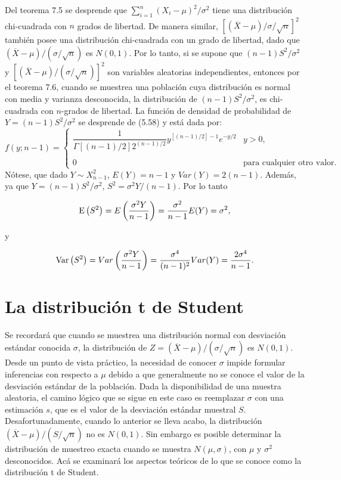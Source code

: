 Del teorema 7.5 se desprende que $\sum_{i=1}^n (X_i-\mu)^2/\sigma^2$ tiene una distribución chi-cuadrada con $n$ grados de libertad. De manera similar, $\left[(\overline{X}-\mu)/\sigma/\sqrt{n}\right]^2$ también posee una distribución chi-cuadrada con un grado de libertad, dado que $(\overline{X}-\mu)/(\sigma/\sqrt{n})$ es $N(0,1)$. Por lo tanto, si se supone que $(n-1)S^2/\sigma^2$ y $\left[(\overline{X}-\mu)/(\sigma/\sqrt{n})\right]^2$ son variables aleatorias independientes, entonces por el teorema 7.6, cuando se muestrea una población cuya distribución es normal con media y varianza desconocida, la distribución de $(n-1)S^2/\sigma^2$, es chi-cuadrada con $n$-grados de libertad. La función de densidad de probabilidad de $Y=(n-1)S^2/\sigma^2$ se desprende de (5.58) y está dada por:
$$
f(y;n-1)=
\left\{
    \begin{array}{lc}
	\dfrac{1}{\Gamma\left[(n-1)/2\right]2^{(n-1)/2}}y^{\left[(n-1)/2\right]-1}e^{-y/2} & y>0,\\\\
	0&\mbox{para cualquier otro valor.}
    \end{array}
\right.
$$
Nótese, que dado $Y\sim X_{n-1}^2$, $E(Y)=n-1$ y $Var(Y)=2(n-1)$. Además, ya que $Y=(n-1)S^2/\sigma^2$, $S^2=\sigma^2Y/(n-1)$. Por lo tanto
\begin{tcolorbox}
    $$\mathop{\mbox{\normalfont E}}\nolimits\left(S^2\right)=E\left(\dfrac{\sigma^2 Y}{n-1}\right)=\dfrac{\sigma^2}{n-1}E(Y)=\sigma^2,$$
\end{tcolorbox}

y 

\begin{tcolorbox}
    $$\mathop{\mbox{\normalfont Var}}\nolimits\left(S^2\right)=Var\left(\dfrac{\sigma^2Y}{n-1}\right)=\dfrac{\sigma^4}{(n-1)^2}Var(Y)=\dfrac{2\sigma^4}{n-1}.$$
\end{tcolorbox}


\section{La distribución t de Student}
Se recordará que cuando se muestrea una distribución normal con desviación estándar conocida $\sigma$, la distribución de $Z=(\overline{X}-\mu)/(\sigma/\sqrt{n})$ es $N(0,1)$. Desde un punto de vista práctico, la necesidad de conocer $\sigma$ impide formular inferencias con respecto a $\mu$ debido a que generalmente no se conoce el valor de la desviación estándar de la población. Dada la disponibilidad de una muestra aleatoria, el camino lógico que se sigue en este caso es reemplazar $\sigma$ con una estimación $s$, que es el valor de la desviación estándar muestral $S$. Desafortunadamente, cuando lo anterior se lleva acabo, la distribución $(\overline{X}-\mu)/(S/\sqrt{n})$ no es $N(0,1)$. Sin embargo es posible determinar la distribución de muestreo exacta cuando se muestra $N(\mu,\sigma)$, con $\mu$ y $\sigma^2$ desconocidos. Acá se examinará los aspectos teóricos de lo que se conoce como la distribución t de Student.\\

